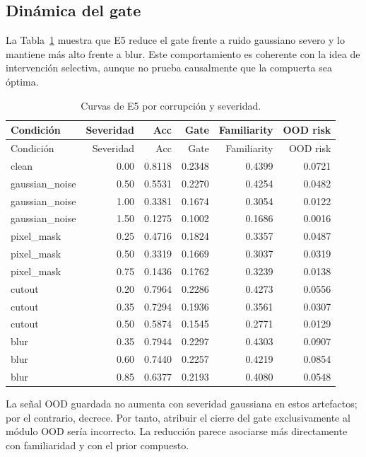 \documentclass[11pt,a4paper]{article}
\begin{document}
\subsection{Dinámica del gate}

La Tabla~\ref{tab:e5_curves} muestra que E5 reduce el gate frente a ruido
gaussiano severo y lo mantiene más alto frente a blur. Este comportamiento es
coherente con la idea de intervención selectiva, aunque no prueba causalmente que
la compuerta sea óptima.

\begin{longtable}{lrrrrr}
\caption{Curvas de E5 por corrupción y severidad.}
\label{tab:e5_curves}\\
\toprule
Condición & Severidad & Acc & Gate & Familiarity & OOD risk \\
\midrule
\endfirsthead
\toprule
Condición & Severidad & Acc & Gate & Familiarity & OOD risk \\
\midrule
\endhead
clean & 0.00 & 0.8118 & 0.2348 & 0.4399 & 0.0721 \\
gaussian\_noise & 0.50 & 0.5531 & 0.2270 & 0.4254 & 0.0482 \\
gaussian\_noise & 1.00 & 0.3381 & 0.1674 & 0.3054 & 0.0122 \\
gaussian\_noise & 1.50 & 0.1275 & 0.1002 & 0.1686 & 0.0016 \\
pixel\_mask & 0.25 & 0.4716 & 0.1824 & 0.3357 & 0.0487 \\
pixel\_mask & 0.50 & 0.3319 & 0.1669 & 0.3037 & 0.0319 \\
pixel\_mask & 0.75 & 0.1436 & 0.1762 & 0.3239 & 0.0138 \\
cutout & 0.20 & 0.7964 & 0.2286 & 0.4273 & 0.0556 \\
cutout & 0.35 & 0.7294 & 0.1936 & 0.3561 & 0.0307 \\
cutout & 0.50 & 0.5874 & 0.1545 & 0.2771 & 0.0129 \\
blur & 0.35 & 0.7944 & 0.2297 & 0.4303 & 0.0907 \\
blur & 0.60 & 0.7440 & 0.2257 & 0.4219 & 0.0854 \\
blur & 0.85 & 0.6377 & 0.2193 & 0.4080 & 0.0548 \\
\bottomrule
\end{longtable}

La señal OOD guardada no aumenta con severidad gaussiana en estos artefactos; por
el contrario, decrece. Por tanto, atribuir el cierre del gate exclusivamente al
módulo OOD sería incorrecto. La reducción parece asociarse más directamente con
familiaridad y con el prior compuesto.
\end{document}
